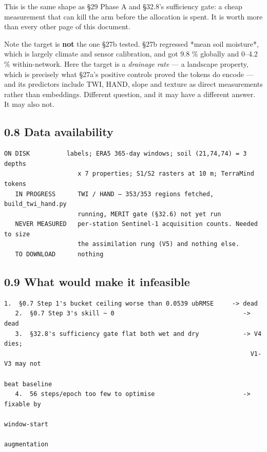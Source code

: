 \documentclass[10pt,a4paper]{article}
\begin{document}
This is the same shape as §29 Phase A and §32.8's sufficiency gate: a cheap
measurement that can kill the arm before the allocation is spent. It is worth
more than every other page of this document.

Note the target is \textbf{not} the one §27b tested. §27b regressed *mean soil
moisture*, which is largely climate and sensor calibration, and got 9.8 \%
globally and 0–4.2 \% within-network. Here the target is a \emph{drainage rate} — a
landscape property, which is precisely what §27a's positive controls proved the
tokens do encode — and its predictors include TWI, HAND, slope and texture as
direct measurements rather than embeddings. Different question, and it may have
a different answer. It may also not.

\subsection*{0.8 Data availability}

\begin{Verbatim}[fontsize=\scriptsize,frame=leftline,framerule=0.6pt,rulecolor=\color{rulegray},xleftmargin=6pt,framesep=6pt,]
   ON DISK          labels; ERA5 365-day windows; soil (21,74,74) = 3 depths
                    x 7 properties; S1/S2 rasters at 10 m; TerraMind tokens
   IN PROGRESS      TWI / HAND — 353/353 regions fetched, build_twi_hand.py
                    running, MERIT gate (§32.6) not yet run
   NEVER MEASURED   per-station Sentinel-1 acquisition counts. Needed to size
                    the assimilation rung (V5) and nothing else.
   TO DOWNLOAD      nothing
\end{Verbatim}

\subsection*{0.9 What would make it infeasible}

\begin{Verbatim}[fontsize=\scriptsize,frame=leftline,framerule=0.6pt,rulecolor=\color{rulegray},xleftmargin=6pt,framesep=6pt,]
   1.  §0.7 Step 1's bucket ceiling worse than 0.0539 ubRMSE     -> dead
   2.  §0.7 Step 3's skill ~ 0                                   -> dead
   3.  §32.8's sufficiency gate flat both wet and dry            -> V4 dies;
                                                                   V1-V3 may not
                                                                   beat baseline
   4.  56 steps/epoch too few to optimise                        -> fixable by
                                                                   window-start
                                                                   augmentation
\end{Verbatim}
\end{document}
